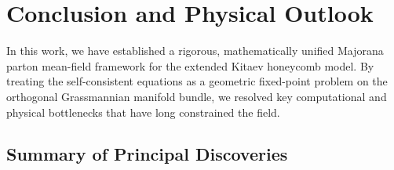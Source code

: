 \section{Conclusion and Physical Outlook}
\label{sec:conclusion}

In this work, we have established a rigorous, mathematically unified Majorana parton mean-field framework for the extended Kitaev honeycomb model. By treating the self-consistent equations as a geometric fixed-point problem on the orthogonal Grassmannian manifold bundle, we resolved key computational and physical bottlenecks that have long constrained the field.

\subsection{Summary of Principal Discoveries}
